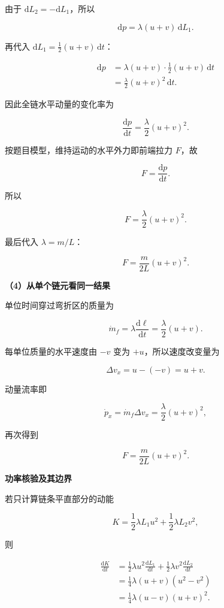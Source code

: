 \documentclass[12pt,a4paper,UTF8]{ctexart}
\begin{document}
由于 \(\mathrm{d}L_2=-\mathrm{d}L_1\)，所以

\[
\mathrm{d}p=\lambda(u+v)\,\mathrm{d}L_1.
\]

再代入 \(\mathrm{d}L_1=\frac12(u+v)\,\mathrm{d}t\)：

\[
\begin{aligned}
\mathrm{d}p
&=\lambda(u+v)\cdot\frac12(u+v)\,\mathrm{d}t\\
&=\frac{\lambda}{2}(u+v)^2\,\mathrm{d}t.
\end{aligned}
\]

因此全链水平动量的变化率为

\[
\frac{\mathrm{d}p}{\mathrm{d}t}=\frac{\lambda}{2}(u+v)^2.
\]

按题目模型，维持运动的水平外力即前端拉力 \(F\)，故

\[
F=\frac{\mathrm{d}p}{\mathrm{d}t}.
\]

所以

\[
\boxed{F=\frac{\lambda}{2}(u+v)^2}.
\]

最后代入 \(\lambda=m/L\)：

\[
\boxed{F=\frac{m}{2L}(u+v)^2}.
\]

\textbf{（4）从单个链元看同一结果}

单位时间穿过弯折区的质量为

\[
\dot m_f=\lambda\frac{\mathrm{d}\ell}{\mathrm{d}t}
=\frac{\lambda}{2}(u+v).
\]

每单位质量的水平速度由 \(-v\) 变为 \(+u\)，所以速度改变量为

\[\Delta v_x=u-(-v)=u+v.\]

动量流率即

\[
\dot p_x=\dot m_f\Delta v_x
=\frac{\lambda}{2}(u+v)^2,
\]

再次得到

\[F=\frac{m}{2L}(u+v)^2.\]

\textbf{功率核验及其边界}

若只计算链条平直部分的动能

\[K=\frac12\lambda L_1u^2+\frac12\lambda L_2v^2,\]

则

\[
\begin{aligned}
\frac{\mathrm{d}K}{\mathrm{d}t}
&=\frac12\lambda u^2\frac{\mathrm{d}L_1}{\mathrm{d}t}
+\frac12\lambda v^2\frac{\mathrm{d}L_2}{\mathrm{d}t}\\
&=\frac14\lambda(u+v)(u^2-v^2)\\
&=\frac14\lambda(u-v)(u+v)^2.
\end{aligned}
\]
\end{document}
